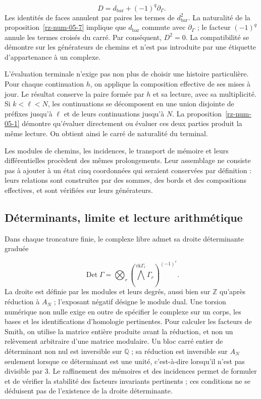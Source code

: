 \[
D=d_{\mathrm{bar}}+(-1)^q\partial_\Gamma.
\]
Les identités de faces annulent par paires les termes de \(d_{\mathrm{bar}}^2\). La naturalité de la proposition~\ref{rz-num-05-7} implique que \(d_{\mathrm{bar}}\) commute avec \(\partial_\Gamma\) ; le facteur \((-1)^q\) annule les termes croisés du carré. Par conséquent, \(D^2=0\). La compatibilité se démontre sur les générateurs de chemins et n'est pas introduite par une étiquette d'appartenance à un complexe.

L'évaluation terminale n'exige pas non plus de choisir une histoire particulière. Pour chaque continuation \(h\), on applique la composition effective de ses mises à jour. Le résultat conserve la paire formée par \(h\) et sa lecture, avec sa multiplicité. Si \(k<\ell<N\), les continuations se décomposent en une union disjointe de préfixes jusqu'à \(\ell\) et de leurs continuations jusqu'à \(N\). La proposition~\ref{rz-num-05-1} démontre qu'évaluer directement ou évaluer ces deux parties produit la même lecture. On obtient ainsi le carré de naturalité du terminal.

Les modules de chemins, les incidences, le transport de mémoire et leurs différentielles procèdent des mêmes prolongements. Leur assemblage ne consiste pas à ajouter à un état cinq coordonnées qui seraient conservées par définition : leurs relations sont construites par des sommes, des bords et des compositions effectives, et sont vérifiées sur leurs générateurs.

\subsection{Déterminants, limite et lecture arithmétique}
Dans chaque troncature finie, le complexe libre admet sa droite déterminante graduée

\[
\operatorname{Det}\Gamma=
\bigotimes_r\left(\bigwedge^{\mathrm{rk}\Gamma_r}\Gamma_r\right)^{(-1)^r}.
\]
La droite est définie par les modules et leurs degrés, aussi bien sur \(\mathbb Z\) qu'après réduction à \(A_N\) ; l'exposant négatif désigne le module dual. Une torsion numérique non nulle exige en outre de spécifier le complexe sur un corps, les bases et les identifications d'homologie pertinentes. Pour calculer les facteurs de Smith, on utilise la matrice entière produite avant la réduction, et non un relèvement arbitraire d'une matrice modulaire. Un bloc carré entier de déterminant non nul est inversible sur \(\mathbb Q\) ; sa réduction est inversible sur \(A_N\) seulement lorsque ce déterminant est une unité, c'est-à-dire lorsqu'il n'est pas divisible par \(3\). Le raffinement des mémoires et des incidences permet de formuler et de vérifier la stabilité des facteurs invariants pertinents ; ces conditions ne se déduisent pas de l'existence de la droite déterminante.

